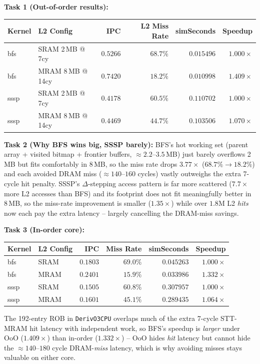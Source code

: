 \documentclass[11pt]{article}
\begin{document}
\textbf{Task 1 (Out-of-order results):}
\begin{center}
\begin{tabular}{llrrrr}
\toprule
Kernel & L2 Config & IPC & L2 Miss Rate & simSeconds & Speedup \\
\midrule
bfs & SRAM 2\,MB @ 7cy & $0.5266$ & $68.7\%$ & $0.015496$ & $1.000\times$ \\
bfs & MRAM 8\,MB @ 14cy & $0.7420$ & $18.2\%$ & $0.010998$ & $\mathbf{1.409\times}$ \\
sssp & SRAM 2\,MB @ 7cy & $0.4178$ & $60.5\%$ & $0.110702$ & $1.000\times$ \\
sssp & MRAM 8\,MB @ 14cy & $0.4469$ & $44.7\%$ & $0.103506$ & $\mathbf{1.070\times}$ \\
\bottomrule
\end{tabular}
\end{center}

\textbf{Task 2 (Why BFS wins big, SSSP barely):} BFS's hot working set (parent array + visited bitmap + frontier buffers, $\approx2.2$--$3.5$\,MB) just barely overflows 2\,MB but fits comfortably in 8\,MB, so the miss rate drops $3.77\times$ ($68.7\%\to18.2\%$) and each avoided DRAM miss ($\approx140$--$160$ cycles) vastly outweighs the extra 7-cycle hit penalty. SSSP's $\Delta$-stepping access pattern is far more scattered ($7.7\times$ more L2 accesses than BFS) and its footprint does not fit meaningfully better in 8\,MB, so the miss-rate improvement is smaller ($1.35\times$) while over $1.8$M L2 \emph{hits} now each pay the extra latency -- largely cancelling the DRAM-miss savings.

\textbf{Task 3 (In-order core):}
\begin{center}
\begin{tabular}{llrrrr}
\toprule
Kernel & L2 Config & IPC & Miss Rate & simSeconds & Speedup \\
\midrule
bfs & SRAM & $0.1803$ & $69.0\%$ & $0.045263$ & $1.000\times$ \\
bfs & MRAM & $0.2401$ & $15.9\%$ & $0.033986$ & $1.332\times$ \\
sssp & SRAM & $0.1505$ & $60.8\%$ & $0.307957$ & $1.000\times$ \\
sssp & MRAM & $0.1601$ & $45.1\%$ & $0.289435$ & $1.064\times$ \\
\bottomrule
\end{tabular}
\end{center}
The 192-entry ROB in \texttt{DerivO3CPU} overlaps much of the extra 7-cycle STT-MRAM hit latency with independent work, so BFS's speedup is \emph{larger} under OoO ($1.409\times$) than in-order ($1.332\times$) -- OoO hides \emph{hit} latency but cannot hide the $\approx140$--$180$ cycle DRAM-\emph{miss} latency, which is why avoiding misses stays valuable on either core.
\end{document}
